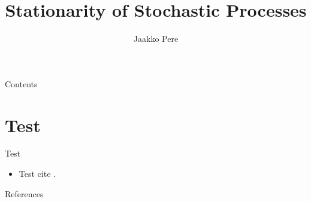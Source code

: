 \documentclass{beamer}
\title{Stationarity of Stochastic Processes}
\author{Jaakko Pere}
\date{\DTMdisplaydate{2023}{11}{06}{-1}}
\begin{document}
\frame{\titlepage}

\begin{frame}{Contents}
\tableofcontents
\end{frame}


\section{Test}


\begin{frame}{Test}
  \begin{itemize}
    \item Test cite \parencite{brockwell2009}.
  \end{itemize}
\end{frame}


\begin{frame}[allowframebreaks]{References}
  \printbibliography
\end{frame}
\end{document}
